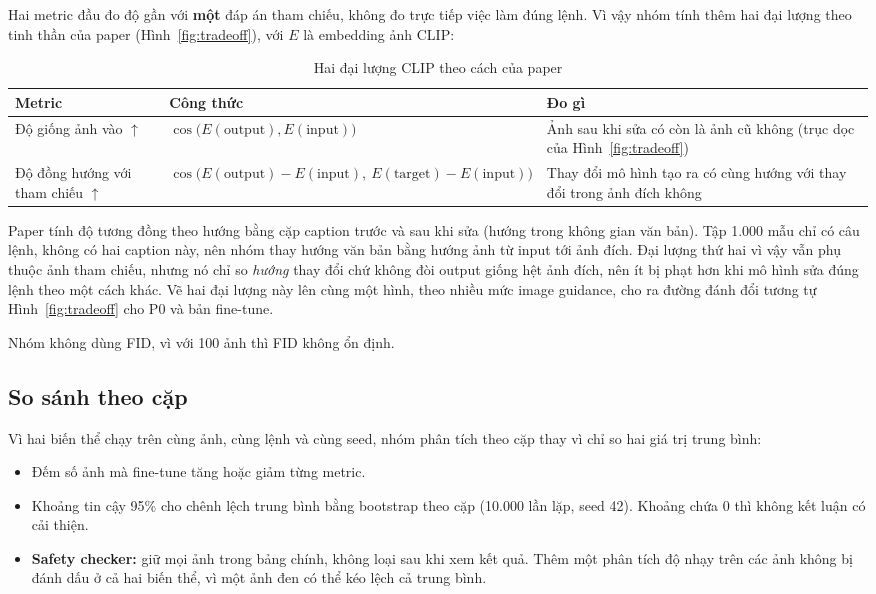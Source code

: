 \documentclass[12pt,a4paper]{article}
\begin{document}
Hai metric đầu đo độ gần với \textbf{một} đáp án tham chiếu, không đo trực tiếp việc
làm đúng lệnh. Vì vậy nhóm tính thêm hai đại lượng theo tinh thần của paper
(Hình~\ref{fig:tradeoff}), với $E$ là embedding ảnh CLIP:

\begin{table}[H]
\centering
\caption{Hai đại lượng CLIP theo cách của paper}
\small
\begin{tabular}{>{\raggedright\arraybackslash}p{3.6cm}>{\raggedright\arraybackslash}p{5.6cm}>{\raggedright\arraybackslash}p{5.4cm}}
\toprule
Metric & Công thức & Đo gì \\
\midrule
Độ giống ảnh vào $\uparrow$ & $\cos\big(E(\text{output}), E(\text{input})\big)$ & Ảnh
sau khi sửa có còn là ảnh cũ không (trục dọc của Hình~\ref{fig:tradeoff}) \\
Độ đồng hướng với tham chiếu $\uparrow$ & $\cos\big(E(\text{output}) -
E(\text{input}),\ E(\text{target}) - E(\text{input})\big)$ & Thay đổi mô hình tạo ra
có cùng hướng với thay đổi trong ảnh đích không \\
\bottomrule
\end{tabular}
\end{table}

Paper tính độ tương đồng theo hướng bằng cặp caption trước và sau khi sửa (hướng
trong không gian văn bản). Tập 1.000 mẫu chỉ có câu lệnh, không có hai caption này,
nên nhóm thay hướng văn bản bằng hướng ảnh từ input tới ảnh đích. Đại lượng thứ hai
vì vậy vẫn phụ thuộc ảnh tham chiếu, nhưng nó chỉ so \emph{hướng} thay đổi chứ không
đòi output giống hệt ảnh đích, nên ít bị phạt hơn khi mô hình sửa đúng lệnh theo một
cách khác. Vẽ hai đại lượng này lên cùng một hình, theo nhiều mức image guidance, cho
ra đường đánh đổi tương tự Hình~\ref{fig:tradeoff} cho P0 và bản fine-tune.

Nhóm không dùng FID, vì với 100 ảnh thì FID không ổn định.

\subsection{So sánh theo cặp}

Vì hai biến thể chạy trên cùng ảnh, cùng lệnh và cùng seed, nhóm phân tích theo cặp
thay vì chỉ so hai giá trị trung bình:
\begin{itemize}
\item Đếm số ảnh mà fine-tune tăng hoặc giảm từng metric.
\item Khoảng tin cậy 95\% cho chênh lệch trung bình bằng bootstrap theo cặp (10.000
lần lặp, seed 42). Khoảng chứa 0 thì không kết luận có cải thiện.
\item \textbf{Safety checker:} giữ mọi ảnh trong bảng chính, không loại sau khi xem
kết quả. Thêm một phân tích độ nhạy trên các ảnh không bị đánh dấu ở cả hai biến thể,
vì một ảnh đen có thể kéo lệch cả trung bình.
\end{itemize}
\end{document}
